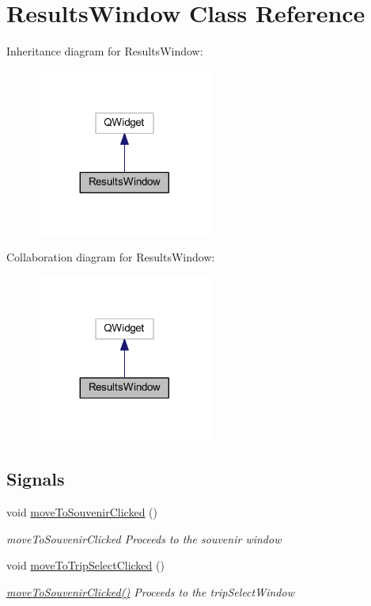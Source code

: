 \hypertarget{class_results_window}{}\section{Results\+Window Class Reference}
\label{class_results_window}


Inheritance diagram for Results\+Window\+:\nopagebreak
\begin{figure}[H]
\begin{center}
\leavevmode
\includegraphics[width=164pt]{class_results_window__inherit__graph}
\end{center}
\end{figure}


Collaboration diagram for Results\+Window\+:\nopagebreak
\begin{figure}[H]
\begin{center}
\leavevmode
\includegraphics[width=164pt]{class_results_window__coll__graph}
\end{center}
\end{figure}
\subsection*{Signals}
\begin{DoxyCompactItemize}
\item 
void \mbox{\hyperlink{class_results_window_aad8d4563c0f82eb6b91e90fd755532a2}{move\+To\+Souvenir\+Clicked}} ()
\begin{DoxyCompactList}\small\item\em move\+To\+Souvenir\+Clicked Proceeds to the souvenir window \end{DoxyCompactList}\item 
void \mbox{\hyperlink{class_results_window_ac80f4ca5ef490f18fd5cdca9defdf203}{move\+To\+Trip\+Select\+Clicked}} ()
\begin{DoxyCompactList}\small\item\em \mbox{\hyperlink{class_results_window_aad8d4563c0f82eb6b91e90fd755532a2}{move\+To\+Souvenir\+Clicked()}} Proceeds to the trip\+Select\+Window \end{DoxyCompactList}\end{DoxyCompactItemize}
